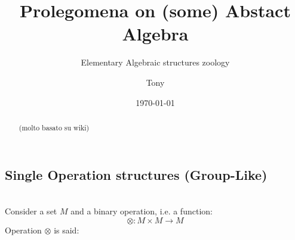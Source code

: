 \documentclass[a4paper,12pt]{scrartcl}    %
\newcommand{\OpA}{\otimes}
\begin{document}
	\title{Prolegomena on (some) Abstact Algebra}
	\subtitle{Elementary Algebraic structures zoology}
	\author{Tony}
	\date{\today}
\maketitle

\begin{abstract}
	(molto basato su wiki)

\end{abstract}

\tableofcontents

\newpage



\begin{landscape}
    \thispagestyle{empty}
    \noindent

	\begin{minipage}[t][]{0.30 \linewidth}
	    \section*{Single Operation structures (Group-Like)}
	    \mbox{}\\
		Consider a set $M$ and a binary operation, i.e. a function:
		\begin{displaymath}
			\OpA : M \times M \rightarrow M
		\end{displaymath}
		Operation $\OpA$ is said:	
		

\end{minipage}
\end{landscape}
\end{document}
